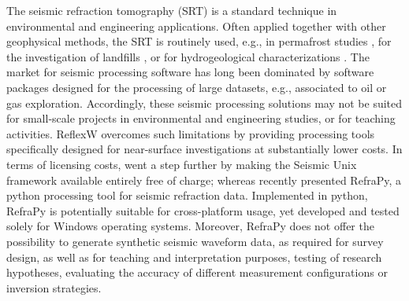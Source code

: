\documentclass[a4paper,fleqn]{cas-sc}
\begin{document}
The seismic refraction tomography (SRT) is a standard technique in environmental and engineering applications. Often applied together with other geophysical methods, the SRT is routinely used, e.g., in 
permafrost studies \citep[e.g.,][]{draebing2016, steiner2021}, for the investigation of landfills \citep[e.g.,][]{nguyen2018, steiner2022}, or for hydrogeological characterizations \citep[e.g.,][]{buecker2021}. 
The market for seismic processing software has long been dominated by software packages designed for the processing of large datasets, e.g., associated to oil or gas exploration. 
Accordingly, these seismic processing solutions may not be suited for small-scale projects in environmental and engineering studies, or for teaching activities. 
ReflexW overcomes such limitations by providing processing tools specifically designed for near-surface investigations at substantially lower costs. In terms of licensing costs, 
\citet{stockwell1999} went a step further by making the Seismic Unix framework available entirely free of charge; whereas \citet{guedes2022} recently presented RefraPy, a python processing tool for seismic refraction data. 
Implemented in python, RefraPy is potentially suitable for cross-platform usage, yet \citet{guedes2022} developed and tested 
solely for Windows operating systems. Moreover, RefraPy does not offer the possibility to generate synthetic seismic waveform data, as required for survey design, as well as for teaching and interpretation purposes, testing of research hypotheses, evaluating the accuracy of different measurement configurations or inversion strategies.
\end{document}
